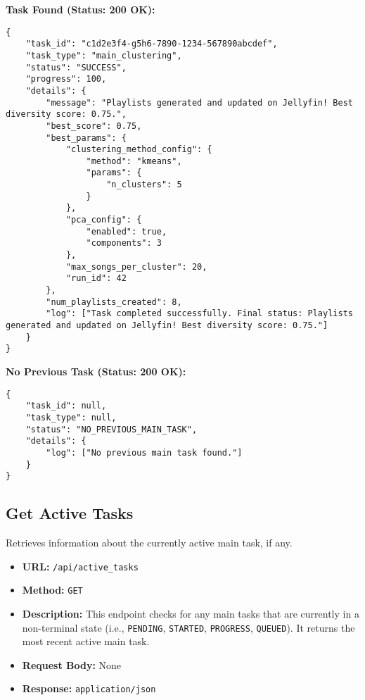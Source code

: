 \documentclass{article}
\begin{document}
\textbf{Task Found (Status: 200 OK):}
\lstset{language=json, caption=Example Response: Get Last Overall Task Status (Task Found)}
\begin{lstlisting}
{
    "task_id": "c1d2e3f4-g5h6-7890-1234-567890abcdef",
    "task_type": "main_clustering",
    "status": "SUCCESS",
    "progress": 100,
    "details": {
        "message": "Playlists generated and updated on Jellyfin! Best diversity score: 0.75.",
        "best_score": 0.75,
        "best_params": {
            "clustering_method_config": {
                "method": "kmeans",
                "params": {
                    "n_clusters": 5
                }
            },
            "pca_config": {
                "enabled": true,
                "components": 3
            },
            "max_songs_per_cluster": 20,
            "run_id": 42
        },
        "num_playlists_created": 8,
        "log": ["Task completed successfully. Final status: Playlists generated and updated on Jellyfin! Best diversity score: 0.75."]
    }
}
\end{lstlisting}

\textbf{No Previous Task (Status: 200 OK):}
\lstset{language=json, caption=Example Response: Get Last Overall Task Status (No Previous Task)}
\begin{lstlisting}
{
    "task_id": null,
    "task_type": null,
    "status": "NO_PREVIOUS_MAIN_TASK",
    "details": {
        "log": ["No previous main task found."]
    }
}
\end{lstlisting}

\subsection{Get Active Tasks}
Retrieves information about the currently active main task, if any.
\begin{itemize}[noitemsep]
    \item \textbf{URL:} \verb|/api/active_tasks|
    \item \textbf{Method:} \texttt{GET}
    \item \textbf{Description:} This endpoint checks for any main tasks that are currently in a non-terminal state (i.e., \texttt{PENDING}, \texttt{STARTED}, \texttt{PROGRESS}, \texttt{QUEUED}). It returns the most recent active main task.
    \item \textbf{Request Body:} None
    \item \textbf{Response:} \texttt{application/json}
\end{itemize}
\end{document}
